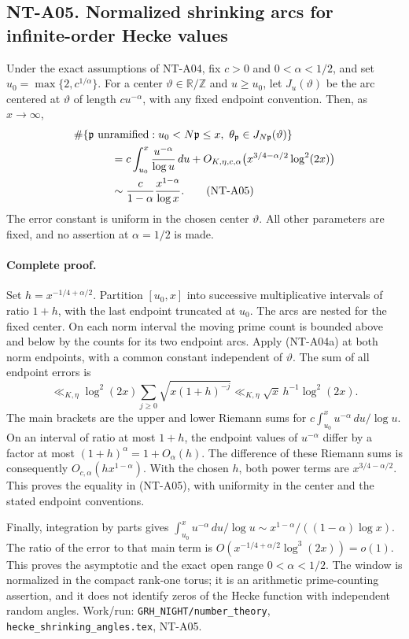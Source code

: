 \subsection*{NT-A05. Normalized shrinking arcs for infinite-order Hecke values}
Under the exact assumptions of NT-A04, fix
$c>0$ and $0<\alpha<1/2$, and set
$u_0=\max\{2,c^{1/\alpha}\}$.
For a center $\vartheta\in\mathbb R/\mathbb Z$ and $u\ge u_0$,
let $J_u(\vartheta)$ be the arc centered at $\vartheta$ of length
$cu^{-\alpha}$, with any fixed endpoint convention. Then, as $x\to\infty$,
\begin{align}
 &\#\{\mathfrak p\text{ unramified}:u_0<N\mathfrak p\le x,\
               \theta_{\mathfrak p}\in J_{N\mathfrak p}(\vartheta)\}
       \notag\\
 &\hspace{12mm}
   =c\int_{u_0}^x\frac{u^{-\alpha}}{\log u}\,du
       +O_{K,\eta,c,\alpha}
          \bigl(x^{3/4-\alpha/2}\log^2(2x)\bigr)
       \notag\\
 &\hspace{12mm}\sim\frac{c}{1-\alpha}\frac{x^{1-\alpha}}{\log x}.
                                                               \tag{NT-A05}
\end{align}
The error constant is uniform in the chosen center $\vartheta$.
All other parameters are fixed, and no assertion at $\alpha=1/2$
is made.

\paragraph{Complete proof.}
Set $h=x^{-1/4+\alpha/2}$. Partition $[u_0,x]$ into
successive multiplicative intervals of ratio $1+h$, with the
last endpoint truncated at $u_0$. The arcs are nested for the
fixed center. On each norm interval the moving prime count is
bounded above and below by the counts for its two endpoint arcs.
Apply (NT-A04a) at both norm endpoints, with a common constant
independent of $\vartheta$. The sum of all endpoint errors is
\[
 \ll_{K,\eta}\log^2(2x)
      \sum_{j\ge0}\sqrt{x(1+h)^{-j}}
 \ll_{K,\eta}\sqrt x\,h^{-1}\log^2(2x).
\]
The main brackets are the upper and lower Riemann sums for
$c\int_{u_0}^x u^{-\alpha}\,du/\log u$.
On an interval of ratio at most $1+h$, the endpoint values of
$u^{-\alpha}$ differ by a factor at most
$(1+h)^\alpha=1+O_\alpha(h)$. The difference of these Riemann
sums is consequently
$O_{c,\alpha}(h x^{1-\alpha})$.
With the chosen $h$, both power terms are $x^{3/4-\alpha/2}$.
This proves the equality in (NT-A05), with uniformity in the
center and the stated endpoint conventions.

Finally, integration by parts gives
$\int_{u_0}^x u^{-\alpha}\,du/\log u
\sim x^{1-\alpha}/((1-\alpha)\log x)$.
The ratio of the error to that main term is
$O(x^{-1/4+\alpha/2}\log^3(2x))=o(1)$.
This proves the asymptotic and the exact open range
$0<\alpha<1/2$. The window is normalized in the compact rank-one
torus; it is an arithmetic prime-counting assertion, and it does
not identify zeros of the Hecke function with independent random
angles. Work/run: \texttt{GRH\_NIGHT/number\_theory},
\texttt{hecke\_shrinking\_angles.tex}, NT-A05.
